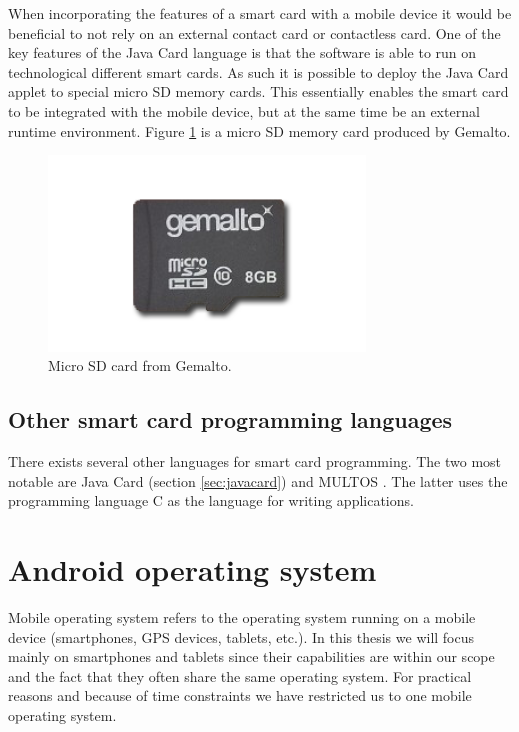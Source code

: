 When incorporating the features of a smart card with a mobile device it would be beneficial to not rely on an external contact card or contactless card. One of the key features of the Java Card language is that the software is able to run on technological different smart cards. As such it is possible to deploy the Java Card applet to special micro SD memory cards. This essentially enables the smart card to be integrated with the mobile device, but at the same time be an external runtime environment. Figure \ref{fig:msdcard} is a micro SD memory card produced by Gemalto.

\begin{figure}[h!]
  \caption{Micro SD card from Gemalto.}
  \label{fig:msdcard}
  \centering
    \includegraphics[width=0.75\textwidth]{images/msd.png}
\end{figure}


\subsection{Other smart card programming languages}
There exists several other languages for smart card programming. The two most notable are Java Card (section \ref{sec:javacard}) and MULTOS \cite{multos}. The latter uses the programming language C as the language for writing applications.

\section{Android operating system}
Mobile operating system refers to the operating system running on a mobile device (smartphones, GPS devices, tablets, etc.). In this thesis we will focus mainly on smartphones and tablets since their capabilities are within our scope and the fact that they often share the same operating system. For practical reasons and because of time constraints we have restricted us to one mobile operating system.

